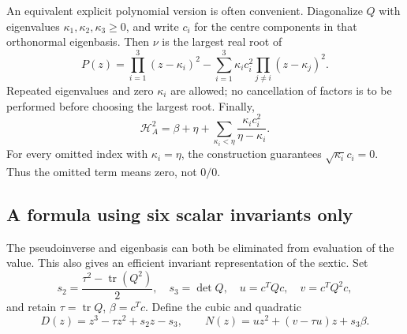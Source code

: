 \documentclass[11pt]{article}
\theoremstyle{remark}\newtheorem{remark}[theorem]{Remark}
\newcommand{\tr}{\operatorname{tr}}
\newcommand{\HF}{\mathcal H}
\begin{document}
An equivalent explicit polynomial version is often convenient. Diagonalize
$Q$ with eigenvalues $\kappa_1,\kappa_2,\kappa_3\geq0$, and write $c_i$ for
the centre components in that orthonormal eigenbasis. Then $\nu$ is the
largest real root of
\begin{equation}\label{eq:poly}
 P(z)=\prod_{i=1}^3(z-\kappa_i)^2
 -\sum_{i=1}^3\kappa_i c_i^2\prod_{j\ne i}(z-\kappa_j)^2.
\end{equation}
Repeated eigenvalues and zero $\kappa_i$ are allowed; no cancellation of
factors is to be performed before choosing the largest root. Finally,
\begin{equation}\label{eq:diagvalue}
 \HF_A^2=\beta+\eta+
 \sum_{\kappa_i<\eta}\frac{\kappa_i c_i^2}{\eta-\kappa_i}.
\end{equation}
For every omitted index with $\kappa_i=\eta$, the construction guarantees
$\sqrt{\kappa_i}c_i=0$. Thus the omitted term means zero, not $0/0$.

\subsection{A formula using six scalar invariants only}

The pseudoinverse and eigenbasis can both be eliminated from evaluation of
the value. This also gives an efficient invariant representation of the sextic.
Set
\[
 s_2=\frac{\tau^2-\tr(Q^2)}2,\quad s_3=\det Q,\quad
 u=c^TQc,\quad v=c^TQ^2c,
\]
and retain $\tau=\tr Q$, $\beta=c^Tc$. Define the cubic and quadratic
\begin{equation}\label{eq:compressedDN}
 D(z)=z^3-\tau z^2+s_2z-s_3,\qquad
 N(z)=uz^2+(v-\tau u)z+s_3\beta.
\end{equation}
\end{document}
